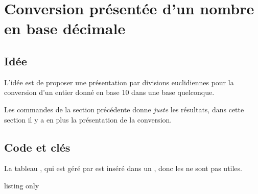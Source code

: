\newpage

\section{Conversion \og présentée \fg{} d'un nombre en base décimale}\label{convrestes}

\subsection{Idée}

\begin{tipblock}
L'idée est de proposer une \og présentation \fg{} par divisions euclidiennes pour la conversion d'un entier donné en base 10 dans une base quelconque.

\smallskip

Les commandes de la section précédente donne \textit{juste} les résultats, dans cette section il y a en plus la présentation de la conversion.
%
%
\end{tipblock}


\subsection{Code et clés}

\begin{PresCodePL}{}
\end{PresCodePL}

\begin{noteblock}
La \og tableau \fg, qui est géré par  est inséré dans un , donc les  ne sont pas utiles.
\end{noteblock}

\begin{PresCodeTexPL}{listing only}
\end{PresCodeTexPL}

